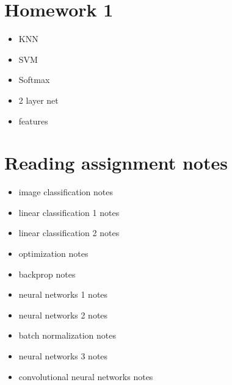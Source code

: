 \documentclass[10pt,letterpaper]{article}
\begin{document}
\section{Homework 1}
\begin{itemize}
\item KNN
\item SVM
\item Softmax
\item 2 layer net
\item features
\end{itemize}


\section{Reading assignment notes}
\begin{itemize}
\item image classification
\subitem notes
\item linear classification 1
\subitem notes
\item linear classification 2
\subitem notes
\item optimization
\subitem notes
\item backprop
\subitem notes
\item neural networks 1
\subitem notes
\item neural networks 2
\subitem notes
\item batch normalization 
\subitem notes
\item neural networks 3
\subitem notes
\item convolutional neural networks
\subitem notes
\end{itemize}
\end{document}
